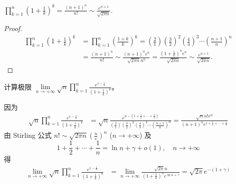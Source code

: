 \documentclass[../../main.tex]{subfiles}%
\begin{document}
\begin{proposition}
$\prod_{k=1}^n{\left( 1+\frac{1}{k} \right) ^k}=\frac{\left( n+1 \right) ^n}{n!}\sim \frac{e^{n+1}}{\sqrt{2\pi n}}.$
\end{proposition}
\begin{proof}
\begin{align*}
\prod_{k=1}^n{\left( 1+\frac{1}{k} \right) ^k}&=\prod_{k=1}^n{\left( \frac{1+k}{k} \right) ^k}=\left( \frac{2}{1} \right) \left( \frac{3}{2} \right) ^2\left( \frac{4}{3} \right) ^3\cdots \left( \frac{n+1}{n} \right) ^n
\\
&=\frac{\left( n+1 \right) ^n}{n!}\sim \frac{\left( n+1 \right) ^ne^n}{\sqrt{2\pi n}n^n}=\frac{\left( 1+\frac{1}{n} \right) ^ne^n}{\sqrt{2\pi n}}\sim \frac{e^{n+1}}{\sqrt{2\pi n}}.
\end{align*}
\end{proof}

\begin{example}
计算极限 $\lim\limits_{n \to +\infty} \sqrt{n} \prod_{k = 1}^{n} \frac{e^{1 - \frac{1}{k}}}{(1 + \frac{1}{k})^k}$。
\end{example}
\begin{solution}
因为
\begin{align*}
\sqrt{n} \prod_{k = 1}^{n} \frac{e^{1 - \frac{1}{k}}}{(1 + \frac{1}{k})^k} &= \sqrt{n} \frac{e^{n - (1 + \frac{1}{2} + \cdots + \frac{1}{n})}}{(\frac{2}{1})(\frac{3}{2})^2 (\frac{4}{3})^3 \cdots (\frac{n + 1}{n})^n} = \frac{\sqrt{n}n!e^n}{(n + 1)^n e^{1 + \frac{1}{2} + \cdots + \frac{1}{n}}}
\end{align*}
由 Stirling 公式 $n! \sim \sqrt{2\pi n} (\frac{n}{e})^n$ ($n \to +\infty$) 及
\[1 + \frac{1}{2} + \cdots + \frac{1}{n} = \ln n + \gamma + o(1),\quad n \to +\infty\]
得
\begin{align*}
\lim_{n \to +\infty} \sqrt{n} \prod_{k = 1}^{n} \frac{e^{1 - \frac{1}{k}}}{(1 + \frac{1}{k})^k} &= \lim_{n \to +\infty} \frac{\sqrt{2\pi}n}{(1 + \frac{1}{n})^n e^{\ln n + \gamma}} = \sqrt{2\pi} e^{-(1 + \gamma)}
\end{align*} 

\end{solution}
\end{document}
